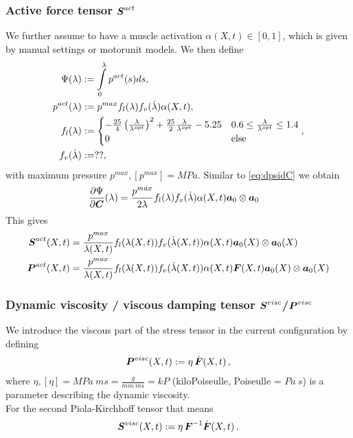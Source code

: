 \subsubsection{Active force tensor $\boldsymbol{S}^{act}$}\label{sec:active_force}
We further assume to have a muscle activation $\alpha(X,t) \in [0,1]$, which is given by manual settings or motorunit models.
We then define
\begin{align}
	\Psi(\lambda) &:= \int\limits_{0}^{\lambda} p^{act}(s)ds,\nonumber\\
	p^{act}(\lambda) &:= p^{max}f_l(\lambda)f_v(\dot{\lambda})\alpha(X,t),\nonumber\\
	f_l(\lambda) &:= \begin{cases}
		-\frac{25}{4}\left(\frac{\lambda}{\lambda^{opt}}\right)^2 + \frac{25}{2}\frac{\lambda}{\lambda^{opt}} - 5.25 & 0.6 \leq \frac{\lambda}{\lambda^{opt}} \leq 1.4\\ 
		0 & \text{else}
	\end{cases} \label{def:fl},\\
	f_v(\dot{\lambda}) &:= ??,
\end{align}
with maximum pressure $p^{max}, [p^{max}] = MPa$.
Similar to \eqref{eq:dpsidC} we obtain
\begin{align}
	\frac{\partial \Psi}{\partial \boldsymbol{C}}(\lambda) &= \frac{p^{max}}{2\lambda}f_l(\lambda)f_v(\dot{\lambda})\alpha(X,t)\boldsymbol{a}_0\otimes\boldsymbol{a}_0
\end{align}
This gives
\begin{align}
	\boldsymbol{S}^{act}(X,t) &= \frac{p^{max}}{\lambda(X,t)}f_l(\lambda(X,t))f_v(\dot{\lambda}(X,t))\alpha(X,t)\boldsymbol{a}_0(X)\otimes\boldsymbol{a}_0(X)\\
	\boldsymbol{P}^{act}(X,t) &= \frac{p^{max}}{\lambda(X,t)}f_l(\lambda(X,t))f_v(\dot{\lambda}(X,t))\alpha(X,t)\boldsymbol{F}(X,t)\boldsymbol{a}_0(X)\otimes\boldsymbol{a}_0(X)
\end{align}

\subsubsection{Dynamic viscosity / viscous damping tensor $\boldsymbol{S}^{visc}$/$\boldsymbol{P}^{visc}$}
We introduce the viscous part of the stress tensor in the current configuration by defining
\begin{align}
\boldsymbol{P}^{visc}(X,t) := \eta\,\dot{\boldsymbol{F}}(X,t) \,,
\end{align}
where $\eta, [\eta] = MPa\ ms = \frac{g}{mm\ ms} = kP$ (kiloPoiseulle, Poiseulle = $Pa\ s$) is a parameter describing the dynamic viscosity.
\\
For the second Piola-Kirchhoff tensor that means
\begin{align}
\boldsymbol{S}^{visc}(X,t) := \eta\,\boldsymbol{F}^{-1}\dot{\boldsymbol{F}}(X,t) \,.
\end{align}

